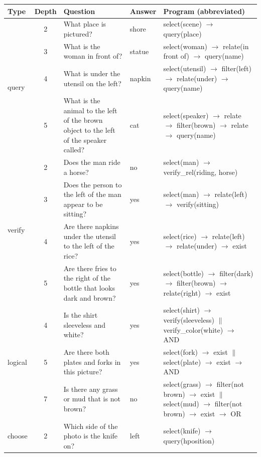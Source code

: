 \documentclass[11pt]{article}
\begin{document}
\begin{table}[h]
\centering
\small
\renewcommand{\arraystretch}{1.25}
\begin{tabular}{p{1.1cm} c p{6.2cm} p{1.2cm} p{4.8cm}}
\toprule
\textbf{Type} & \textbf{Depth} & \textbf{Question} & \textbf{Answer} & \textbf{Program (abbreviated)} \\
\midrule
\multirow{4}{*}{query}
  & 2 & What place is pictured? & shore
    & select(scene) $\to$ query(place) \\
  & 3 & What is the woman in front of? & statue
    & select(woman) $\to$ relate(in front of) $\to$ query(name) \\
  & 4 & What is under the utensil on the left? & napkin
    & select(utensil) $\to$ filter(left) $\to$ relate(under) $\to$ query(name) \\
  & 5 & What is the animal to the left of the brown object to the left of the speaker called? & cat
    & select(speaker) $\to$ relate $\to$ filter(brown) $\to$ relate $\to$ query(name) \\
\midrule
\multirow{4}{*}{verify}
  & 2 & Does the man ride a horse? & no
    & select(man) $\to$ verify\_rel(riding, horse) \\
  & 3 & Does the person to the left of the man appear to be sitting? & yes
    & select(man) $\to$ relate(left) $\to$ verify(sitting) \\
  & 4 & Are there napkins under the utensil to the left of the rice? & yes
    & select(rice) $\to$ relate(left) $\to$ relate(under) $\to$ exist \\
  & 5 & Are there fries to the right of the bottle that looks dark and brown? & yes
    & select(bottle) $\to$ filter(dark) $\to$ filter(brown) $\to$ relate(right) $\to$ exist \\
\midrule
\multirow{3}{*}{logical}
  & 4 & Is the shirt sleeveless and white? & yes
    & select(shirt) $\to$ verify(sleeveless) $\parallel$ verify\_color(white) $\to$ AND \\
  & 5 & Are there both plates and forks in this picture? & yes
    & select(fork) $\to$ exist $\parallel$ select(plate) $\to$ exist $\to$ AND \\
  & 7 & Is there any grass or mud that is not brown? & no
    & select(grass) $\to$ filter(not brown) $\to$ exist $\parallel$ select(mud) $\to$ filter(not brown) $\to$ exist $\to$ OR \\
\midrule
\multirow{2}{*}{choose}
  & 2 & Which side of the photo is the knife on? & left
    & select(knife) $\to$ query(hposition) \\

\end{tabular}
\end{table}
\end{document}
